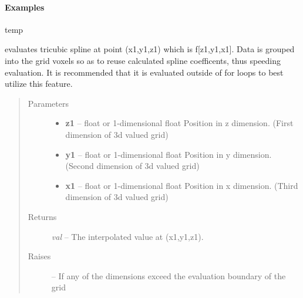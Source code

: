 \documentclass[letterpaper,10pt,english]{sphinxmanual}
\begin{document}
\begin{fulllineitems}
\begin{quote}
\begin{description}
\begin{itemize}
\end{itemize}

\end{description}\end{quote}
\paragraph{Examples}

temp

\begin{fulllineitems}
\label{eqtools:eqtools.trispline.Spline.ev}
evaluates tricubic spline at point (x1,y1,z1) which is f{[}z1,y1,x1{]}.
Data is grouped into the grid voxels so as to reuse calculated spline
coefficents, thus speeding evaluation.  It is recommended that it is
evaluated outside of for loops to best utilize this feature.
\begin{quote}\begin{description}
\item[{Parameters }] \leavevmode\begin{itemize}
\item {} 
\textbf{z1} --
float or 1-dimensional float
Position in z dimension. (First dimension of 3d valued grid)

\item {} 
\textbf{y1} --
float or 1-dimensional float
Position in y dimension. (Second dimension of 3d valued grid)

\item {} 
\textbf{x1} --
float or 1-dimensional float
Position in x dimension. (Third dimension of 3d valued grid)

\end{itemize}

\item[{Returns}] \leavevmode
\emph{val} --
The interpolated value at (x1,y1,z1).

\item[{Raises }] \leavevmode
{} -- 
If any of the dimensions exceed the evaluation boundary
of the grid

\end{description}\end{quote}

\end{fulllineitems}


\end{fulllineitems}
\end{document}
